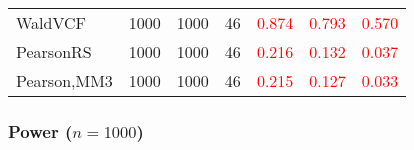 \documentclass[
]{article}
\begin{document}
\begin{table}[H]
{\begin{tabular}[t]{lrrrrrr}
\hspace{1em}WaldVCF & 1000 & 1000 & 46 & \textcolor{red}{0.874} & \textcolor{red}{0.793} & \textcolor{red}{0.570}\\
\hspace{1em}PearsonRS & 1000 & 1000 & 46 & \textcolor{red}{0.216} & \textcolor{red}{0.132} & \textcolor{red}{0.037}\\
\hspace{1em}Pearson,MM3 & 1000 & 1000 & 46 & \textcolor{red}{0.215} & \textcolor{red}{0.127} & \textcolor{red}{0.033}\\
\bottomrule
\end{tabular}}
\endgroup{}
\end{table}

\hypertarget{power-n1000-1}{%
\subsubsection{\texorpdfstring{Power
(\(n=1000\))}{Power (n=1000)}}\label{power-n1000-1}}
\end{document}
